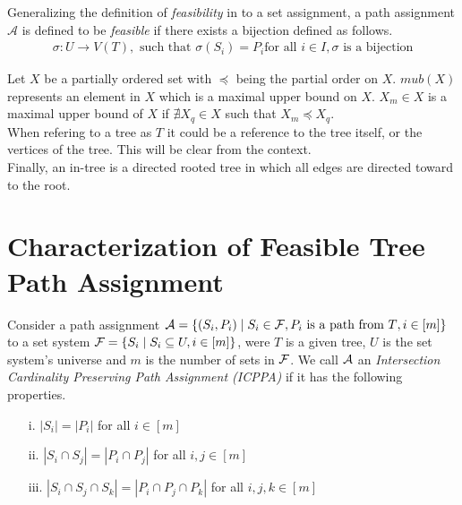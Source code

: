 \documentclass{llncs}
\def\cA{{\cal A}}
\def\cF{{\cal F}}
\def\A{{\mathcal A}}
\begin{document}
\noindent
Generalizing the definition of {\em feasibility} in \cite{nsnrs09} to
a set assignment, a path assignment $\A$ is defined to be {\em
  feasible} if there exists a bijection defined as follows.
\begin{align}
  \sigma: U \rightarrow V(T), \text{ such that }\sigma(S_i) = P_i \text{
    for all } i \in I, \sigma \text{ is a bijection}
\label{eq:stf}
\end{align}



\noindent
Let $X$ be a partially ordered set with $\preccurlyeq$ being the
partial order on $X$.  $mub(X)$ represents an element in $X$ which is
a maximal upper bound on $X$.  $X_m \in X$ is a maximal upper bound of
$X$ if $\nexists X_q \in X$ such that $X_m
\preccurlyeq X_q$. \\


\noindent
When refering to a tree as $T$ it could be a reference to the tree
itself, or the vertices of the tree. This will be clear from the
context.\\

\noindent
Finally, an in-tree is a directed rooted tree in which all edges are
directed toward to the root.

\section{Characterization of Feasible Tree Path  Assignment} 
\label{feasible} 
Consider a path assignment $\cA = \{(S_i, P_i) \mid S_i \in \cF, P_i
\text{ is a path from $T$}, i \in [m]\}$ to a set system $\cF = \{S_i
\mid S_i \subseteq U, i \in [m]\}$, were $T$ is a given tree, $U$ is
the set system's universe and $m$ is the number of sets in $\cF$. We
call $\cA$ an {\em Intersection Cardinality Preserving Path Assignment
  (ICPPA)} if it has the following properties.

\begin{enumerate}
\item [i.]  $|S_i| = |P_i|$ for all $i \in [m]$
\item [ii.] $|S_i \cap S_j| = |P_i \cap P_j|$ for all $i,j \in [m]$
\item [iii.] $|S_i \cap S_j \cap S_k| = |P_i \cap P_j \cap P_k|$ for
  all $i,j,k \in [m]$
\end{enumerate}
\end{document}
